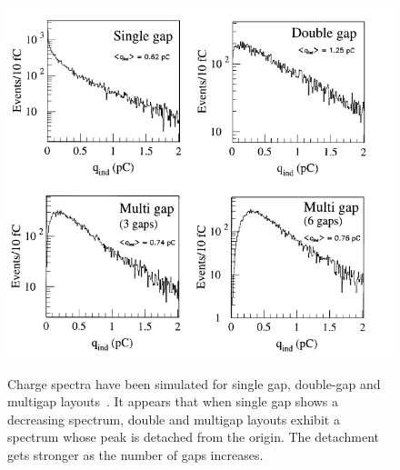 	\begin{figure}[H]
		\centering
		\includegraphics[width = \plotwidth]{fig/chapt4/Layout_charge_distributions.png}\\
		\caption{\label{fig:ChargeSpectra} Charge spectra have been simulated for single gap, double-gap and multigap layouts~\cite{ABBRESCIA99}. It appears that when single gap shows a decreasing spectrum, double and multigap layouts exhibit a spectrum whose peak is detached from the origin. The detachment gets stronger as the number of gaps increases.}
	\end{figure}
	
